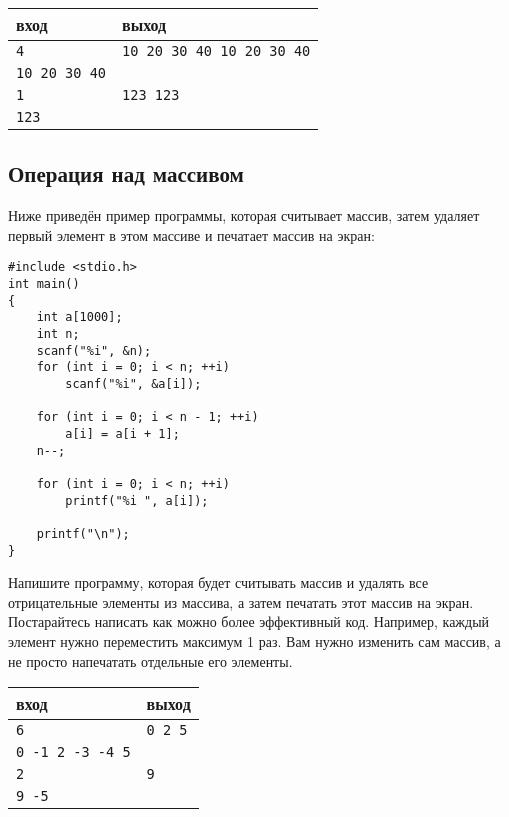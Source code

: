 \documentclass[10pt]{article}
\begin{document}
\begin{center}
\begin{tabular}{ l | l }
 вход & выход \\ \hline
 \texttt{4} & \texttt{10 20 30 40 10 20 30 40}  \\  
 \texttt{10 20 30 40} &  \\ \hline
 \texttt{1} & \texttt{123 123}  \\  
 \texttt{123} &  \\ 
\end{tabular}
\end{center}

\subsection{Операция над массивом}
Ниже приведён пример программы, которая считывает массив, затем удаляет первый элемент в этом массиве и печатает массив на экран:
\begin{lstlisting}
#include <stdio.h>
int main() 
{
    int a[1000];
    int n;
    scanf("%i", &n);
    for (int i = 0; i < n; ++i)
        scanf("%i", &a[i]);
 
    for (int i = 0; i < n - 1; ++i)
        a[i] = a[i + 1];
    n--;    
    
    for (int i = 0; i < n; ++i)
        printf("%i ", a[i]);

    printf("\n");
}
\end{lstlisting}
Напишите программу, которая будет считывать массив и удалять все отрицательные элементы из массива, а затем печатать этот массив на экран. Постарайтесь написать как можно более эффективный код. Например, каждый элемент нужно переместить максимум 1 раз. Вам нужно изменить сам массив, а не просто напечатать отдельные его элементы.
\begin{center}
\begin{tabular}{ l | l }
 вход & выход \\ \hline
 \texttt{6} & \texttt{0 2 5}  \\  
 \texttt{0 -1 2 -3 -4 5} &  \\ \hline
 \texttt{2} & \texttt{9}  \\  
 \texttt{9 -5} &  \\ 
\end{tabular}
\end{center}
\end{document}
